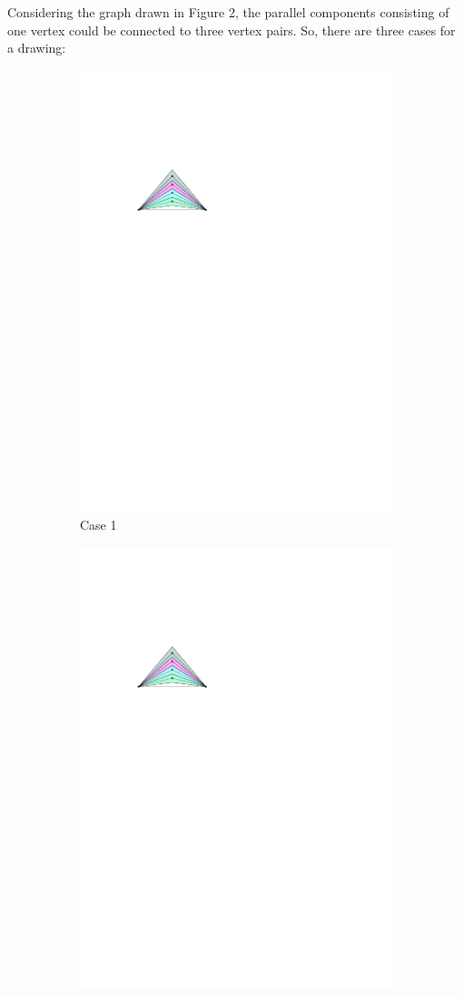 Considering the graph drawn in Figure 2, the parallel components consisting of one vertex could be connected to three vertex pairs. So, there are three cases for a drawing:
\begin{figure}[H]
	\centering
	\begin{subfigure}{0.7\textwidth}
		\centering
		\includegraphics[width=.7\linewidth,page=5]{drawings/2-trees.pdf}
		\caption{Case 1}
	\end{subfigure}
	\begin{subfigure}{0.7\textwidth}
		\centering
		\includegraphics[width=.7\linewidth,page=6]{drawings/2-trees.pdf}

\end{subfigure}
\end{figure}
